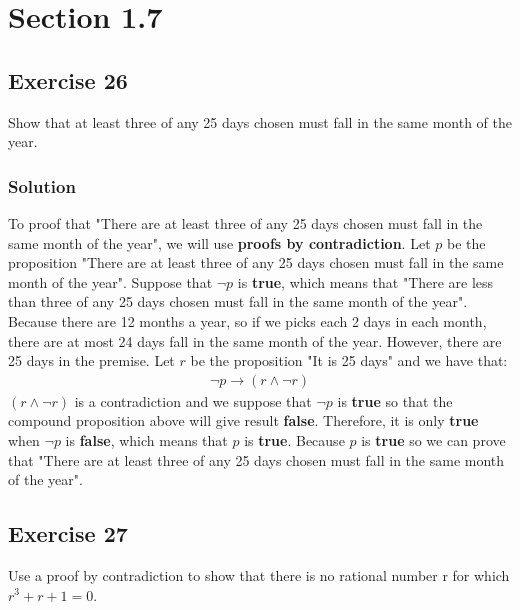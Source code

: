 \documentclass{article}
\begin{document}
\section*{Section 1.7}
\subsection*{Exercise 26}
Show that at least three of any 25 days chosen must fall in the same month of the year.
\subsubsection*{Solution}
To proof that "There are at least three of any 25 days chosen must fall in the same month of the year", we will use \textbf{proofs by contradiction}. Let $p$ be the proposition "There are at least three of any 25 days chosen must fall in the same month of the year". Suppose that $\lnot p$ is \textbf{true}, which means that "There are less than three of any 25 days chosen must fall in the same month of the year". Because there are 12 months a year, so if we picks each 2 days in each month, there are at most 24 days fall in the same month of the year. However, there are 25 days in the premise. Let $r$ be the proposition "It is 25 days" and we have that:
\begin{align*}
    \lnot p \to (r \land \lnot r)
\end{align*}
$(r \land \lnot r)$ is a contradiction and we suppose that $\lnot p$ is \textbf{true} so that the compound proposition above will give result \textbf{false}. Therefore, it is only \textbf{true} when $\lnot p$ is \textbf{false}, which means that $p$ is \textbf{true}. Because $p$ is \textbf{true} so we can prove that "There are at least three of any 25 days chosen must fall in the same month of the year".
\subsection*{Exercise 27}
Use a proof by contradiction to show that there is no rational number r for which $r^3 + r + 1 = 0$.
\end{document}
